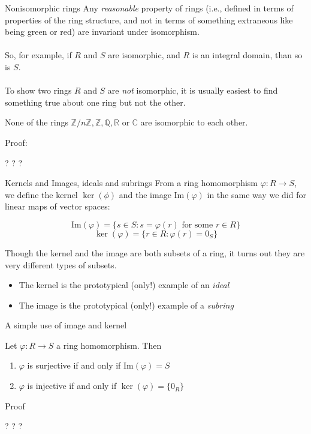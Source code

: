 \documentclass{beamer}
\newcommand{\C}{\mathbb{C}}
\newcommand{\Z}{\mathbb{Z}}
\newcommand{\Q}{\mathbb{Q}}
\newcommand{\R}{\mathbb{R}}
\begin{document}
\begin{frame}{Nonisomorphic rings}
  Any \emph{reasonable} property of rings (i.e., defined in terms of properties of the ring structure, and not in terms of something extraneous like being {\color{green}green} or {\color{red}red}) are invariant under isomorphism.
\\~\\
So, for example, if $R$ and $S$ are isomorphic, and $R$ is an integral domain, than so is $S$.
\\~\\
To show two rings $R$ and $S$ are \emph{not} isomorphic, it is usually easiest to find something true about one ring but not the other.


\begin{lemma} None of the rings $\Z/n\Z, \Z, \Q,\R$ or $\C$ are isomorphic to each other. \end{lemma}
\begin{block}{Proof:}
  \begin{center} ? ? ? \end{center}
  \end{block}

\end{frame}


\begin{frame}{Kernels and Images, ideals and subrings}
  From a ring homomorphism $\varphi:R\to S$, we define the kernel $\ker(\phi)$ and the image $\text{Im}(\varphi)$ in the same way we did for linear maps of vector spaces:

  $$\text{Im}(\varphi)=\{s\in S : s=\varphi(r) \text{ for some } r\in R\}$$
    $$\ker(\varphi)=\{r\in R : \varphi(r)=0_S\}$$

Though the kernel and the image are both subsets of a ring, it turns out they are very different types of subsets.

\begin{itemize}
\item The kernel is the prototypical (only!) example of an \emph{ideal}
  \item The image is the prototypical (only!) example of a \emph{subring}
\end{itemize}
\end{frame}

\begin{frame}{A simple use of image and kernel}

  \begin{lemma} Let $\varphi:R\to S$ a ring homomorphism.  Then

    \begin{enumerate}
    \item $\varphi$ is surjective if and only if $\text{Im}(\varphi)=S$
      \item $\varphi$ is injective if and only if $\ker(\varphi)=\{0_R\}$
      \end{enumerate}
\end{lemma}

\begin{block}{Proof}
\begin{center} ? ? ? \end{center}
\end{block}  
  \end{frame}
\end{document}

